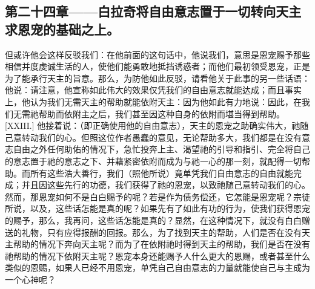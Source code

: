 
\subsection{第二十四章——白拉奇将自由意志置于一切转向天主求恩宠的基础之上。}

但或许他会这样反驳我们：在他前面的这句话中，他说我们，意思是恩宠赐予那些相信并度虔诚生活的人，使他们能勇敢地抵挡诱惑者；而他们最初领受恩宠，正是为了能承行天主的旨意。那么，为防他如此反驳，请看他关于此事的另一些话语：他说：请注意，他宣称如此伟大的效果仅凭我们的自由意志就能达成；而且事实上，他认为我们无需天主的帮助就能依附天主：因为他如此有力地说：因此，在我们无需祂帮助而依附主之后，我们甚至因这种自身的依附而堪当得到帮助。[XXIII.] 他接着说：（即正确使用他的自由意志），天主的恩宠之助确实伟大，祂随己意转动我们的心。但照这位作者愚蠢的意见，无论帮助多大，我们都是在没有意志自由之外任何助佑的情况下，急忙投奔上主、渴望祂的引导和指引、完全将自己的意志置于祂的意志之下、并藉紧密依附而成为与祂一心的那一刻，就配得一切帮助。而所有这些浩大善行，我们（照他所说）竟单凭我们自由意志的自由就能完成；并且因这些先行的功德，我们获得了祂的恩宠，以致祂随己意转动我们的心。然而，那恩宠如何不是白白赐予的呢？若是作为债务偿还，它怎能是恩宠呢？宗徒所说，以及，这些话怎能是真的呢？如果先有了如此有功的行为，使我们获得恩宠的赐予，那么，我再问，这些话怎能是真的？显然，在这种情况下，就没有白白赠送的礼物，只有应得报酬的回报。那么，为了找到天主的帮助，人们是否在没有天主帮助的情况下奔向天主呢？而为了在依附祂时得到天主的帮助，我们是否在没有祂帮助的情况下依附天主呢？恩宠本身还能赐予人什么更大的恩赐，或者甚至什么类似的恩赐，如果人已经不用恩宠，单凭自己自由意志的力量就能使自己与主成为一个心神呢？\par


